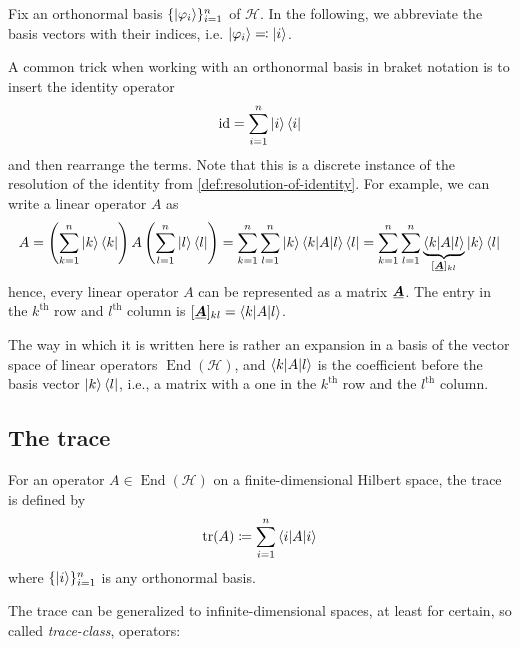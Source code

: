 Fix an orthonormal basis $\{\ket{\varphi_i}\}_{i=1}^n$ of $\mathcal{H}$.
In the following, we abbreviate the basis vectors with their indices, i.e. $\ket{\varphi_{i}} \eqcolon \ket{i}$.

A common trick when working with an orthonormal basis in braket notation is to insert the identity operator
\begin{equation}\label{eq:orthonormal-basis-resolution-identity}
\operatorname{id}
= 
\sum_{i=1}^n \ket{i}\bra{i}
\end{equation}
and then rearrange the terms.
Note that this is a discrete instance of the resolution of the identity from \autoref{def:resolution-of-identity}. 
For example, we can write a linear operator $A$ 
as
\[
A 
= 
\left(\sum_{k=1}^n \ket{k}\bra{k}\right) A \left(\sum_{l=1}^n \ket{l}\bra{l}\right)
=
\sum_{k=1}^n \sum_{l=1}^n  \ket{k} \braket{k|A|l} \bra{l}
=
\sum_{k=1}^n \sum_{l=1}^n  \underbrace{\braket{k|A|l}}_{[\matr{A}]_{kl}} \ket{k}\bra{l}
\]
hence, every linear operator $A$ can be represented as a matrix $\matr{A}$.
The entry in the $k^\text{th}$ row and $l^\text{th}$ column is $[\matr{A}]_{kl} = \braket{k|A|l}$.

The way in which it is written here is rather an expansion in a basis of the vector space of linear operators $\operatorname{End}(\mathcal{H})$, and $\braket{k|A|l}$ is the coefficient before the basis vector $\ket{k}\bra{l}$, i.e., a matrix with a one in the $k^\text{th}$ row and the $l^\text{th}$ column.

\subsection{The trace} \label{sec:trace}

\begin{definition}
For an operator $A \in \operatorname{End}(\mathcal{H})$ on a finite-dimensional Hilbert space, the trace is defined by
\begin{equation}\label{eq:trace-definition}
\operatorname{tr}(A)
\coloneq
\sum_{i = 1}^n \braket{i|A|i}
\end{equation}
where $\{\ket{i}\}_{i=1}^n$ is any orthonormal basis.
\end{definition}

The trace can be generalized to infinite-dimensional spaces, at least for certain, so called \emph{trace-class}, operators:



